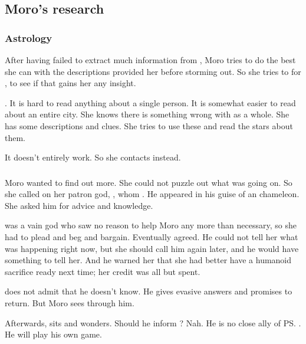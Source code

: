 \subsection{Moro's research}






\subsubsection{Astrology}
After having failed to extract much information from \Tiroco, Moro tries to do the best she can with the descriptions \Tiroco{} provided her before storming out. 
So she tries to  for \Tiroco, to see if that gains her any insight. 

. 
It is hard to read anything about a single person. 
It is somewhat easier to read about an entire city. 
She knows there is something wrong with \Malcur as a whole. 
She has some descriptions and clues. 
She tries to use these and read the stars about them. 

It doesn't entirely work. 
So she contacts \Nasshikerr{} instead. 





\subsubsection{\Nasshikerr}
Moro \Cobrel{} wanted to find out more. 
She could not puzzle out what was going on. 
So she called on her patron god, , whom .
He appeared in his guise of an chameleon.  
She asked him for advice and knowledge. 

\Nasshikerr{} was a vain god who saw no reason to help Moro any more than necessary, so she had to plead and beg and bargain. 
Eventually \Nasshikerr{} agreed. 
He could not tell her what was happening right now, but she should call him again later, and he would have something to tell her. 
And he warned her that she had better have a humanoid sacrifice ready next time; her credit was all but spent. 

\Nasshikerr{} does not admit that he doesn't know. 
He gives evasive answers and promises to return. 
But Moro sees through him. 

Afterwards, \Nasshikerr{} sits and wonders. 
Should he inform \Secherdamon? 
Nah. 
He is no close ally of \ps{\Secherdamon}. 
He will play his own game. 

